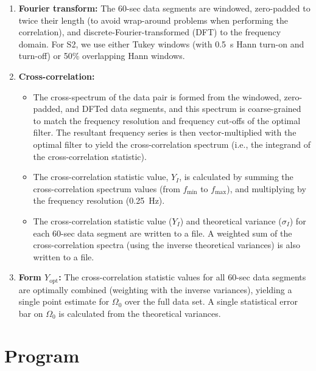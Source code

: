 \begin{enumerate}
\item \textbf{Fourier transform:}
The 60-sec data segments are windowed, zero-padded to twice their length
(to avoid wrap-around problems when performing the correlation), and
discrete-Fourier-transformed (DFT) to the frequency domain. For S2, we
use either Tukey windows (with 0.5~s Hann turn-on and turn-off) or 50\%
overlapping Hann windows.

\item \textbf{Cross-correlation:}
\begin{itemize}
\item The cross-spectrum of the data pair is formed from the windowed,
zero-padded, and DFTed data segments, and this spectrum is
coarse-grained to match the frequency resolution and frequency cut-offs
of the optimal filter. The resultant frequency series is then
vector-multiplied with the optimal filter to yield the cross-correlation
spectrum (i.e., the integrand of the cross-correlation statistic).
\item The cross-correlation statistic value, $Y_I$, is calculated by
summing the cross-correlation spectrum values (from $f_{\mathrm{min}}$ to
$f_{\mathrm{max}}$), and multiplying by the frequency resolution (0.25~Hz).
\item The cross-correlation statistic value ($Y_I$) and theoretical
variance ($\sigma_I$) for each 60-sec data segment are written to a
file. A weighted sum of the cross-correlation spectra (using the inverse
theoretical variances) is also written to a file.
\end{itemize}

\item \textbf{Form $Y_{\mathrm{opt}}$:}
The cross-correlation statistic values for all 60-sec data segments are
optimally combined (weighting with the inverse variances), yielding a
single point estimate for $\Omega_0$ over the full data set. A single
statistical error bar on $\Omega_0$ is calculated from the theoretical
variances.

\end{enumerate}

\clearpage
\section{Program }
\label{program:lalapps-stopp}

